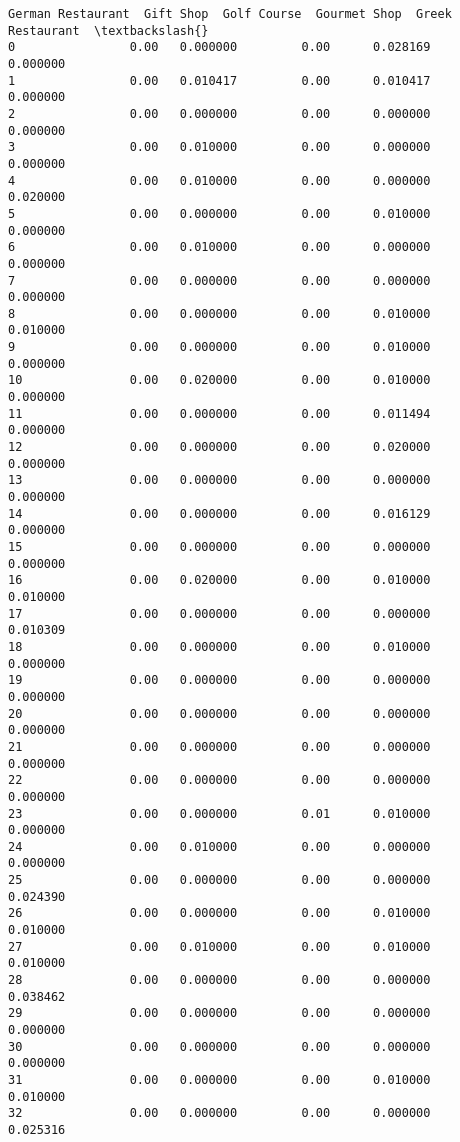 \documentclass[11pt]{article}
\begin{document}
\begin{tcolorbox}[breakable, size=fbox, boxrule=.5pt, pad at break*=1mm, opacityfill=0]
\begin{Verbatim}[commandchars=\\\{\}]
    German Restaurant  Gift Shop  Golf Course  Gourmet Shop  Greek Restaurant  \textbackslash{}
0                0.00   0.000000         0.00      0.028169          0.000000
1                0.00   0.010417         0.00      0.010417          0.000000
2                0.00   0.000000         0.00      0.000000          0.000000
3                0.00   0.010000         0.00      0.000000          0.000000
4                0.00   0.010000         0.00      0.000000          0.020000
5                0.00   0.000000         0.00      0.010000          0.000000
6                0.00   0.010000         0.00      0.000000          0.000000
7                0.00   0.000000         0.00      0.000000          0.000000
8                0.00   0.000000         0.00      0.010000          0.010000
9                0.00   0.000000         0.00      0.010000          0.000000
10               0.00   0.020000         0.00      0.010000          0.000000
11               0.00   0.000000         0.00      0.011494          0.000000
12               0.00   0.000000         0.00      0.020000          0.000000
13               0.00   0.000000         0.00      0.000000          0.000000
14               0.00   0.000000         0.00      0.016129          0.000000
15               0.00   0.000000         0.00      0.000000          0.000000
16               0.00   0.020000         0.00      0.010000          0.010000
17               0.00   0.000000         0.00      0.000000          0.010309
18               0.00   0.000000         0.00      0.010000          0.000000
19               0.00   0.000000         0.00      0.000000          0.000000
20               0.00   0.000000         0.00      0.000000          0.000000
21               0.00   0.000000         0.00      0.000000          0.000000
22               0.00   0.000000         0.00      0.000000          0.000000
23               0.00   0.000000         0.01      0.010000          0.000000
24               0.00   0.010000         0.00      0.000000          0.000000
25               0.00   0.000000         0.00      0.000000          0.024390
26               0.00   0.000000         0.00      0.010000          0.010000
27               0.00   0.010000         0.00      0.010000          0.010000
28               0.00   0.000000         0.00      0.000000          0.038462
29               0.00   0.000000         0.00      0.000000          0.000000
30               0.00   0.000000         0.00      0.000000          0.000000
31               0.00   0.000000         0.00      0.010000          0.010000
32               0.00   0.000000         0.00      0.000000          0.025316

\end{Verbatim}
\end{tcolorbox}
\end{document}
